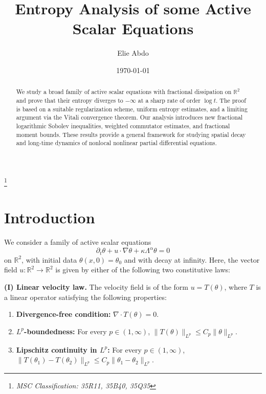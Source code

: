 \documentclass[12pt,reqno]{amsart}
\title[]%
{Entropy Analysis of some Active Scalar Equations}
\author[E. Abdo]{Elie Abdo}
\date{\today}
\newcommand{\pa}{\partial}
\newcommand{\na}{\nabla}
\newcommand{\be}{\begin{equation}}
\newcommand{\ee}{\end{equation}}
\newcommand{\R}{\mathbb R}
\begin{document}
\begin{abstract}
We study a broad family of active scalar equations with fractional dissipation on $\mathbb{R}^2$ and prove that their entropy diverges to $-\infty$ at a sharp rate of order $\log t$. The proof is based on a suitable regularization scheme, uniform entropy estimates, and a limiting argument via the Vitali convergence theorem. Our analysis introduces new fractional logarithmic Sobolev inequalities, weighted commutator estimates, and fractional moment bounds. These results provide a general framework for studying spatial decay and long-time dynamics of nonlocal nonlinear partial differential equations.
\end{abstract}


\noindent\thanks{\em{MSC Classification: 35R11, 35B40, 35Q35}}


\maketitle


\section{Introduction}
We consider a family of active scalar equations 
\be \label{activescalar}
\pa_t \theta + u \cdot \na \theta + \kappa \Lambda^{\alpha}\theta = 0
\ee on $\R^2$, with initial data $\theta(x,0) = \theta_0$ and with decay  at infinity. 
Here, the vector field $u:\mathbb{R}^2\to\mathbb{R}^2$ is given by either of the following two constitutive laws:

\noindent\textbf{(I) Linear velocity law.}
The velocity field is of the form $u=T(\theta)$, where $T$ is a linear operator satisfying the following properties:

\begin{enumerate}
\item[(i)] \textbf{Divergence-free condition:}
$\nabla\cdot T(\theta)=0$.

\item[(ii)] \textbf{$L^p$-boundedness:}
For every $p\in(1,\infty)$,
$\|T(\theta)\|_{L^p}\le C_p\|\theta\|_{L^p}$.

\item[(iii)] \textbf{Lipschitz continuity in $L^p$:}
For every $p\in(1,\infty)$,
$\|T(\theta_1)-T(\theta_2)\|_{L^p}
\le C_p\|\theta_1-\theta_2\|_{L^p}$.
\end{enumerate}
\end{document}

